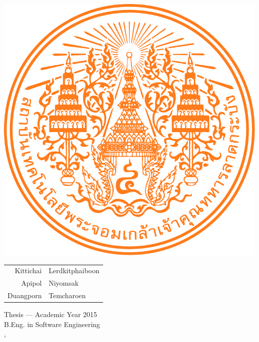 \thispagestyle{empty}
\begin{center}

    \centering
    \includegraphics[width=0.3\linewidth]{res/kmitl_logo.png}
    \vspace{3cm}
    
    \Large\MakeUppercase{\dms}
    \vspace{2cm}
    
    {\Large 
    	\begin{tabular}{rl}
            Kittichai & Lerdkitphaiboon \\
    		Apipol & Niyomsak \\
    		Duangporn & Temcharoen 
    	\end{tabular}
    \par}
    
    \vfill
    
    {\Large Thesis --– Academic Year 2015 \\
    B.Eng. in Software Engineering \\
    \IC, \kmitl\par}

\end{center}